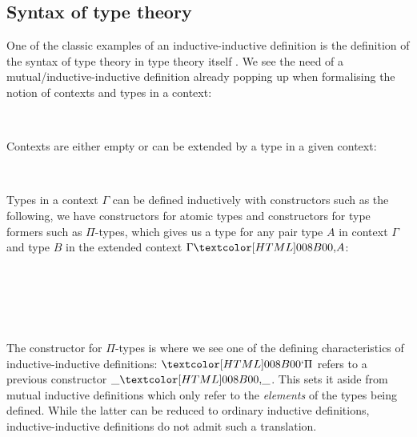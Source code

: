 \subsection{Syntax of type theory}
\label{syntax-of-type-theory}

One of the classic examples of an inductive-inductive definition
\cite{NordvallForsberg2013} is the definition of the syntax of type
theory in type theory itself \cite{Danielsson2006}
\cite{Chapman2009}. We see the need of a mutual/inductive-inductive
definition already popping up when formalising the notion of contexts
and types in a context:
%
\begin{sorts}
  \sortnamety{\ttconty}{\Set} \\
  \sortnamety{\tttyty}{\ttconty \to \Set}
\end{sorts}
%
Contexts are either empty or can be extended by a type in a given
context:
%
\begin{datatype}{\ttconty}{}
  \constr{\ttnil}{\ttconty} \\
  \constr{\ttcons{\_}{\_}}{(\Gamma : \ttconty) \to \tttyty\ \Gamma \to \ttconty}
\end{datatype}
%
Types in a context $\Gamma$ can be defined inductively with
constructors such as the following, \ie we have constructors for
atomic types and constructors for type formers such as $\Pi$-types,
which gives us a type for any pair type $A$ in context $\Gamma$ and
type $B$ in the extended context $\ttcons{\Gamma}{A}$:
%
\begin{datatype}{\tttyty}{}
  \constr{\ttzero}{(\Gamma : \ttconty) \to \tttyty\ \Gamma} \\
  \constr{\ttone}{(\Gamma : \ttconty) \to \tttyty\ \Gamma} \\
  \constrdots \\
   \\
  \constrdots
\end{datatype}
%
The constructor for $\Pi$-types is where we see one of the defining
characteristics of inductive-inductive definitions: $\ttpi$ refers to
a previous constructor $\ttcons{\_}{\_}$. This sets it aside from
mutual inductive definitions which only refer to the \emph{elements}
of the types being defined. While the latter can be reduced to
ordinary inductive definitions, inductive-inductive definitions do not
admit such a translation.

